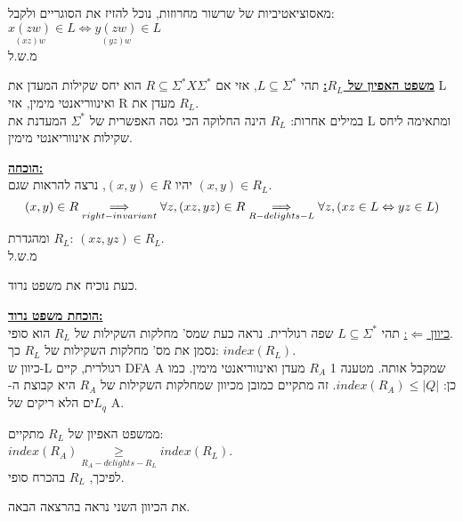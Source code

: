 \documentclass{article}
\begin{document}
\setlength\parskip{\baselineskip}

מאסוציאטיביות של שרשור מחרוזות, נוכל להזיז את הסוגריים ולקבל:\\
$\underset{(xz)w}{x(zw)} \in L \Leftrightarrow \underset{(yz)w}{y(zw)} \in L$\\
מ.ש.ל

\setlength\parskip{\baselineskip}

\textbf{\underline{משפט האפיון של $R_{L}$:}}
תהי  $L \subseteq \Sigma^*$, אזי אם $R \subseteq{\Sigma^*X \Sigma^*}$ הוא יחס שקילות המעדן את L ואינווריאנטי מימין, אזי R מעדן את $R_{L}$.\\
במילים אחרות: $R_{L}$ הינה החלוקה הכי גסה האפשרית של $\Sigma^*$ המעדנת את L ומתאימה ליחס שקילות אינווריאנטי מימין.

\setlength\parskip{\baselineskip}

\textbf{\underline{הוכחה:}}\\
יהיו $(x,y) \in R$, נרצה להראות שגם $(x,y) \in R_{L}$.\\
\begin{equation*}
	(x,y) \in R \underset{right-invariant}{\Longrightarrow} \forall z,(xz,yz) \in R \underset{R-delights-L}{\Longrightarrow}
	\forall z,(xz \in L \Leftrightarrow yz \in L)\\
\end{equation*}
ומהגדרת $R_{L}$: $(xz,yz) \in R_{L}$.\\
מ.ש.ל

\setlength\parskip{\baselineskip}

כעת נוכיח את משפט נרוד.

\setlength\parskip{\baselineskip}

\textbf{\underline{הוכחת משפט נרוד:}}\\
\underline{כיוון $\Leftarrow$:} תהי $L \subseteq \Sigma^*$ שפה רגולרית. נראה כעת שמס' מחלקות השקילות של $R_{L}$ הוא סופי.\\
נסמן את מס' מחלקות השקילות של $R_{L}$ כך: $index(R_{L})$.\\
כיוון ש-L רגולרית, קיים DFA A שמקבל אותה. מטענה 1 $R_{A}$ מעדן ואינווריאנטי מימין. כמו כן: $index(R_{A}) \leq |Q|$.
זה מתקיים כמובן מכיוון שמחלקות השקילות של $R_{A}$ היא קבוצת ה-$L_{q}$ים הלא ריקים של A.\\

\setlength\parskip{\baselineskip}

ממשפט האפיון של $R_{L}$ מתקיים:\\
$index(R_{A}) \underset{R_{A}-delights-R_{L}}{\geq}index(R_{L})$.\\
לפיכך, $R_{L}$ בהכרח סופי.

\setlength\parskip{\baselineskip}

את הכיוון השני נראה בהרצאה הבאה.
\end{document}
